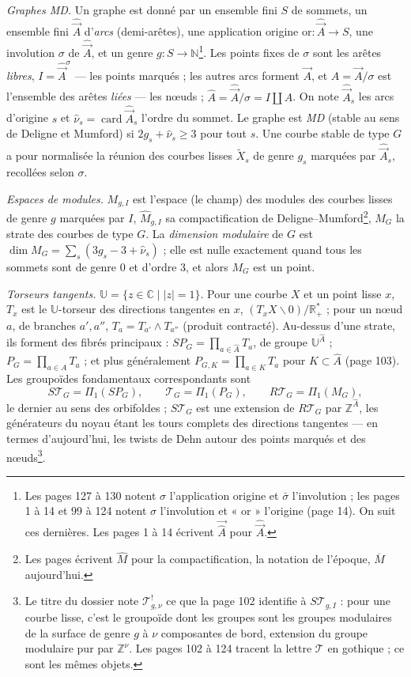 \documentclass[11pt,a4paper]{article}
\begin{document}
\emph{Graphes MD.} Un graphe est donné par un ensemble fini $S$ de sommets, un
ensemble fini $\hat{\vec A}$ d'\emph{arcs} (demi-arêtes), une application
origine $\mathrm{or} : \hat{\vec A} \to S$, une involution $\sigma$ de
$\hat{\vec A}$, et un genre $g : S \to \mathbb{N}$\footnote{Les pages 127 à 130
notent $\sigma$ l'application origine et $\bar\sigma$ l'involution ; les pages
1 à 14 et 99 à 124 notent $\sigma$ l'involution et « or » l'origine (page 14).
On suit ces dernières. Les pages 1 à 14 écrivent $\vec{\hat A}$ pour
$\hat{\vec A}$.}. Les points fixes de $\sigma$ sont les arêtes \emph{libres},
$I = \hat{\vec A}^{\sigma}$ — les points marqués ; les autres arcs forment
$\vec A$, et $A = \vec A/\sigma$ est l'ensemble des arêtes \emph{liées} — les
nœuds ; $\hat A = \hat{\vec A}/\sigma = I \amalg A$. On note $\hat{\vec A}_s$
les arcs d'origine $s$ et $\hat\nu_s = \operatorname{card} \hat{\vec A}_s$
l'ordre du sommet. Le graphe est \emph{MD} (stable au sens de Deligne et
Mumford) si $2g_s + \hat\nu_s \geq 3$ pour tout $s$. Une courbe stable de type
$G$ a pour normalisée la réunion des courbes lisses $\widetilde{X}_s$ de genre
$g_s$ marquées par $\hat{\vec A}_s$, recollées selon $\sigma$.

\emph{Espaces de modules.} $M_{g,I}$ est l'espace (le champ) des modules des
courbes lisses de genre $g$ marquées par $I$, $\widehat{M}_{g,I}$ sa
compactification de Deligne--Mumford\footnote{Les pages écrivent $\hat M$ pour
la compactification, la notation de l'époque, $\overline{M}$ aujourd'hui.},
$M_G$ la strate des courbes de type $G$. La \emph{dimension modulaire} de $G$
est $\dim M_G = \sum_s (3g_s - 3 + \hat\nu_s)$ ; elle est nulle exactement
quand tous les sommets sont de genre $0$ et d'ordre $3$, et alors $M_G$ est un
point.

\emph{Torseurs tangents.} $\mathbb{U} = \{ z \in \mathbb{C} \mid |z| = 1\}$.
Pour une courbe $X$ et un point lisse $x$, $T_x$ est le
$\mathbb{U}$-torseur des directions tangentes en $x$, $(T_xX \smallsetminus
0)/\mathbb{R}^{*}_{+}$ ; pour un nœud $a$, de branches $a', a''$, $T_a =
T_{a'} \wedge T_{a''}$ (produit contracté). Au-dessus d'une strate, ils
forment des fibrés principaux : $SP_G = \prod_{a \in \hat A} T_a$, de groupe
$\mathbb{U}^{\hat A}$ ; $P_G = \prod_{a \in A} T_a$ ; et plus généralement
$P_{G,K} = \prod_{a \in K} T_a$ pour $K \subset \hat A$ (page 103). Les
groupoïdes fondamentaux correspondants sont
\[
S\mathcal{T}_G = \Pi_1(SP_G), \qquad \mathcal{T}_G = \Pi_1(P_G), \qquad
R\mathcal{T}_G = \Pi_1(M_G),
\]
le dernier au sens des orbifoldes ; $S\mathcal{T}_G$ est une extension de
$R\mathcal{T}_G$ par $\mathbb{Z}^{\hat A}$, les générateurs du noyau étant
les tours complets des directions tangentes — en termes d'aujourd'hui, les
twists de Dehn autour des points marqués et des nœuds\footnote{Le titre du
dossier note $\mathcal{T}^{!}_{g,\nu}$ ce que la page 102 identifie à
$S\mathcal{T}_{g,I}$ : pour une courbe lisse, c'est le groupoïde dont les
groupes sont les groupes modulaires de la surface de genre $g$ à $\nu$
composantes de bord, extension du groupe modulaire pur par
$\mathbb{Z}^{\nu}$. Les pages 102 à 124 tracent la lettre $\mathcal{T}$ en
gothique ; ce sont les mêmes objets.}.
\end{document}
